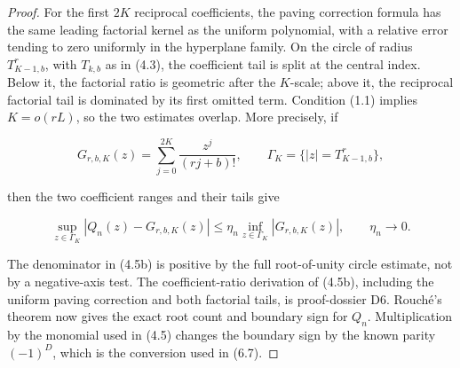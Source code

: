 \documentclass[10pt]{article}
\begin{document}
\begin{proof}


For the first $2K$ reciprocal coefficients, the paving correction formula
has the same leading factorial kernel as the uniform polynomial, with a
relative error tending to zero uniformly in the hyperplane family.  On the
circle of radius $T_{K-1,b}^r$, with $T_{k,b}$ as in (4.3), the coefficient
tail is split at the central
index.  Below it, the factorial ratio is geometric after the $K$-scale;
above it, the reciprocal factorial tail is dominated by its first omitted
term.  Condition (1.1) implies $K=o(rL)$, so the two estimates overlap.
More precisely, if

\[
 G_{r,b,K}(z)=\sum_{j=0}^{2K}\frac{z^j}{(rj+b)!},
 \qquad \Gamma_K=\{|z|=T_{K-1,b}^r\}, \tag{4.5a}
\]

then the two coefficient ranges and their tails give

\[
 \sup_{z\in\Gamma_K}|Q_n(z)-G_{r,b,K}(z)|
 \le \eta_n
 \inf_{z\in\Gamma_K}|G_{r,b,K}(z)|,
 \qquad \eta_n\longrightarrow0. \tag{4.5b}
\]

The denominator in (4.5b) is positive by the full root-of-unity circle
estimate, not by a negative-axis test.  The coefficient-ratio derivation of
(4.5b), including the uniform paving correction and both factorial tails, is
proof-dossier D6.  Rouché's theorem now gives the exact root count and boundary
sign for $Q_n$.
Multiplication by the monomial used in (4.5) changes the boundary sign by the
known parity $(-1)^D$, which is the conversion used in (6.7).
\end{proof}
\end{document}
